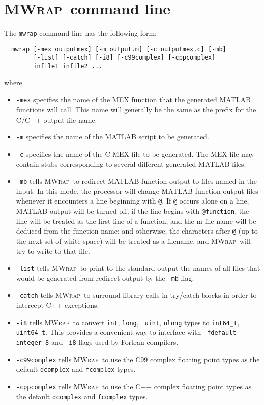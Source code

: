 \documentclass[12pt]{article}
\newcommand{\mwrap}{\textsc{MWrap}}
\begin{document}
\section{\mwrap\ command line}

The {\tt mwrap} command line has the following form:
\begin{verbatim}
  mwrap [-mex outputmex] [-m output.m] [-c outputmex.c] [-mb] 
        [-list] [-catch] [-i8] [-c99complex] [-cppcomplex] 
        infile1 infile2 ...
\end{verbatim}
where
\begin{itemize}

\item {\tt -mex} specifies the name of the MEX function that the
  generated MATLAB functions will call.  This name will generally be
  the same as the prefix for the C/C++ output file name.

\item {\tt -m} specifies the name of the MATLAB script to be
  generated.

\item {\tt -c} specifies the name of the C MEX file to be generated.
  The MEX file may contain stubs corresponding to several different
  generated MATLAB files.

\item {\tt -mb} tells \mwrap\ to redirect MATLAB function output to
  files named in the input.  In this mode, the processor will change
  MATLAB function output files whenever it encounters a line
  beginning with \verb|@|.  If \verb|@| occurs alone on a line,
  MATLAB output will be turned off; if the line begins with \verb|@function|,
  the line will be treated as the first line of a function, and the m-file
  name will be deduced from the function name; and otherwise, the characters 
  after \verb|@| (up to the next set of white space) will be treated as a
  filename, and \mwrap\ will try to write to that file.

\item {\tt -list} tells \mwrap\ to print to the standard output the
  names of all files that would be generated from redirect output by
  the {\tt -mb} flag.

\item {\tt -catch} tells \mwrap\ to surround library calls in try/catch
  blocks in order to intercept C++ exceptions.

\item {\tt -i8} tells \mwrap\ to convert {\tt int}, {\tt long}, {\tt
  uint}, {\tt ulong} types to {\tt int64\_t}, {\tt uint64\_t}. This
  provides a convenient way to interface with {\tt -fdefault-integer-8}
  and {\tt -i8} flags used by Fortran compilers.

\item {\tt -c99complex} tells \mwrap\ to use the C99 complex floating
  point types as the default {\tt dcomplex} and {\tt fcomplex} types.

\item {\tt -cppcomplex} tells \mwrap\ to use the C++ complex floating
  point types as the default {\tt dcomplex} and {\tt fcomplex} types.

\end{itemize}
\end{document}
